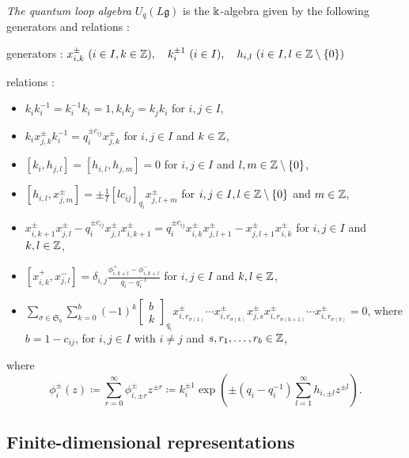 \begin{Def}
\label{Def : quantum loop algebra}
\emph{The quantum loop algebra} $U_q(L\mathfrak{g})$
is the $\Bbbk$-algebra given by the following generators and relations :

generators : \quad
$x_{i, k}^{\pm}\ (i \in I, k \in \mathbb{Z}), \quad
k_i^{\pm 1}\ (i \in I), \quad
h_{i, l}\ (i \in I, l \in \mathbb{Z} \setminus \{0\})$

relations :
\begin{itemize}
    \item $k_i k_i^{-1} = k_i^{-1} k_i = 1,
    k_i k_j = k_j k_i$ for $i, j \in I$,
    \item $k_i x_{j, k}^{\pm} k_i^{-1}
    = q_i^{\pm c_{ij}} x_{j, k}^{\pm}$
    for $i, j \in I$ and $k \in \mathbb{Z}$,
    \item $[k_i, h_{j, l}] = [h_{i, l}, h_{j, m}] = 0$
    for $i, j \in I$ and $l, m \in \mathbb{Z} \setminus \{0\}$,
    \item $[h_{i, l}, x_{j, m}^{\pm}]
    = \pm \frac{1}{l}[l c_{ij}]_{q_i}x_{j, l + m}^{\pm}$
    for $i, j \in I, l \in \mathbb{Z} \setminus \{0\}$ and $m \in \mathbb{Z}$,
    \item $x_{i, k + 1}^{\pm} x_{j, l}^{\pm}
    - q_i^{\pm c_{ij}} x_{j, l}^{\pm} x_{i, k + 1}^{\pm}
    = q_i^{\pm c_{ij}} x_{i, k}^{\pm} x_{j, l + 1}^{\pm}
    - x_{j, l + 1}^{\pm} x_{i, k}^{\pm}$
    for $i, j \in I$ and $k, l \in \mathbb{Z}$,
    \item $[x_{i, k}^{+}, x_{j, l}^{-}]
    = \displaystyle\delta_{i, j}
    \frac{\phi_{i, k + l}^{+} - \phi_{i, k + l}^{-}}{q_i - q_i^{-1}}$
    for $i, j \in I$ and $k, l \in \mathbb{Z}$,
    \item $\displaystyle\sum_{\sigma \in \mathfrak{S}_b}\sum_{k = 0}^{b}
    (-1)^k \left[\begin{matrix} b \\ k \end{matrix}\right]_{q_i}
    x_{i, r_{\sigma(1)}}^{\pm}\cdots x_{i, r_{\sigma(k)}}^{\pm}
    x_{j, s}^{\pm} x_{i, r_{\sigma(k + 1)}}^{\pm}\cdots
    x_{i, r_{\sigma(b)}}^{\pm} = 0$,
    where $b = 1 - c_{ij}$, for $i, j \in I$ with $i \neq j$
    and $s, r_1, \ldots, r_b \in \mathbb{Z}$,
\end{itemize}
where
\[
\phi_i^{\pm}(z) \coloneq
\sum_{r = 0}^{\infty}\phi_{i, \pm r}^{\pm}z^{\pm r} \coloneq
k_i^{\pm 1}\exp\left(\pm (q_i - q_i^{-1})
\sum_{l = 1}^{\infty}h_{i, \pm l}z^{\pm l}\right).
\]
\end{Def}

\subsection{Finite-dimensional representations}
\label{ssec : finite-dimensional representations}

